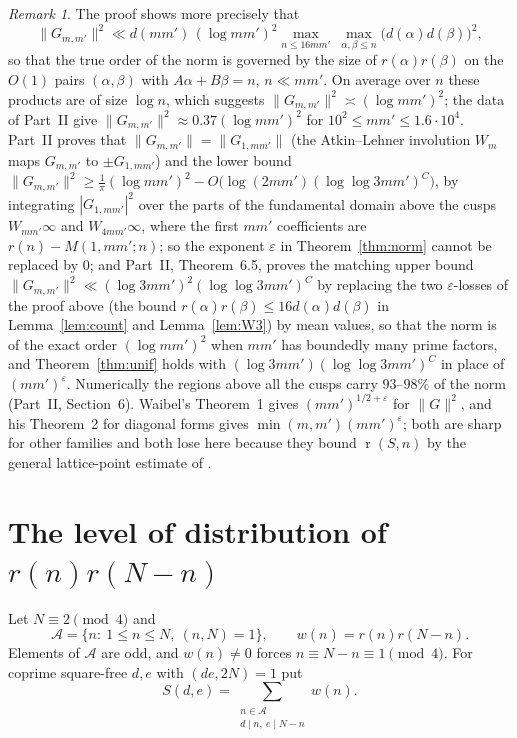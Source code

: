 \documentclass[11pt]{amsart}
\theoremstyle{remark}
\newtheorem{remark}[theorem]{Remark}
\newcommand{\cA}{\mathcal{A}}
\newcommand{\e}{\varepsilon}
\DeclareMathOperator{\rk}{r}
\begin{document}
\begin{remark}\label{rem:heur}
The proof shows more precisely that
\[
\|G_{m,m'}\|^2\ll d(mm')\,(\log mm')^2\max_{n\le16mm'}\ \max_{\alpha,\beta\le n}\bigl(d(\alpha)d(\beta)\bigr)^2,
\]
so that the true order of the norm is governed by the size of $r(\alpha)r(\beta)$ on the $O(1)$ pairs $(\alpha,\beta)$ with $A\alpha+B\beta=n$, $n\ll mm'$. On average over $n$ these products are of size $\log n$, which suggests $\|G_{m,m'}\|^2\asymp(\log mm')^2$; the data of Part~II \cite[Section~5]{ChenII} give $\|G_{m,m'}\|^2\approx0.37(\log mm')^2$ for $10^2\le mm'\le1.6\cdot10^4$. Part~II \cite[Theorem~1.5]{ChenII} proves that $\|G_{m,m'}\|=\|G_{1,mm'}\|$ (the Atkin--Lehner involution $W_m$ maps $G_{m,m'}$ to $\pm G_{1,mm'}$) and the lower bound $\|G_{m,m'}\|^2\ge\frac1\pi(\log mm')^2-O\bigl(\log(2mm')(\log\log3mm')^{C}\bigr)$, by integrating $|G_{1,mm'}|^2$ over the parts of the fundamental domain above the cusps $W_{mm'}\infty$ and $W_{4mm'}\infty$, where the first $mm'$ coefficients are $r(n)-M(1,mm';n)$; so the exponent $\e$ in Theorem~\ref{thm:norm} cannot be replaced by $0$; and Part~II, Theorem~6.5, proves the matching upper bound $\|G_{m,m'}\|^2\ll(\log3mm')^2(\log\log3mm')^C$ by replacing the two $\e$-losses of the proof above (the bound $r(\alpha)r(\beta)\le16d(\alpha)d(\beta)$ in Lemma~\ref{lem:count} and Lemma~\ref{lem:W3}) by mean values, so that the norm is of the exact order $(\log mm')^2$ when $mm'$ has boundedly many prime factors, and Theorem~\ref{thm:unif} holds with $(\log3mm')(\log\log3mm')^C$ in place of $(mm')^\e$. Numerically the regions above all the cusps carry $93$--$98\%$ of the norm (Part~II, Section~6). Waibel's Theorem~1 gives $(mm')^{1/2+\e}$ for $\|G\|^2$, and his Theorem~2 for diagonal forms gives $\min(m,m')(mm')^{\e}$; both are sharp for other families and both lose here because they bound $\rk(S,n)$ by the general lattice-point estimate of \cite[Lemma~9]{Waibel}.
\end{remark}

\section{The level of distribution of $r(n)r(N-n)$}\label{sec:level}

Let $N\equiv2\pmod4$ and
\[
\cA=\{n:\ 1\le n\le N,\ (n,N)=1\},\qquad w(n)=r(n)r(N-n).
\]
Elements of $\cA$ are odd, and $w(n)\ne0$ forces $n\equiv N-n\equiv1\pmod 4$. For coprime square-free $d,e$ with $(de,2N)=1$ put
\[
S(d,e)=\sum_{\substack{n\in\cA\\ d\mid n,\ e\mid N-n}}w(n).
\]
\end{document}
